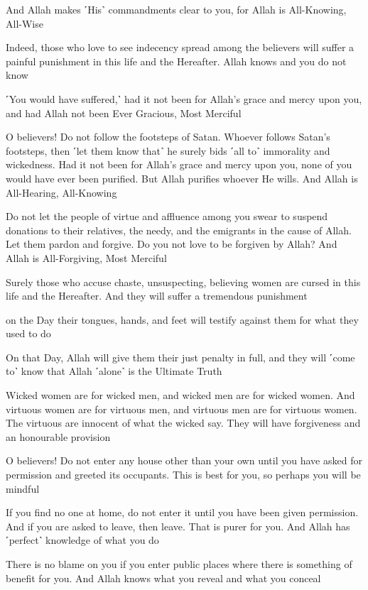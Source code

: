 And Allah makes ˹His˺ commandments clear to you, for Allah is All-Knowing, All-Wise

Indeed, those who love to see indecency spread among the believers will suffer a painful punishment in this life and the Hereafter. Allah knows and you do not know

˹You would have suffered,˺ had it not been for Allah’s grace and mercy upon you, and had Allah not been Ever Gracious, Most Merciful

O believers! Do not follow the footsteps of Satan. Whoever follows Satan’s footsteps, then ˹let them know that˺ he surely bids ˹all to˺ immorality and wickedness. Had it not been for Allah’s grace and mercy upon you, none of you would have ever been purified. But Allah purifies whoever He wills. And Allah is All-Hearing, All-Knowing

Do not let the people of virtue and affluence among you swear to suspend donations to their relatives, the needy, and the emigrants in the cause of Allah. Let them pardon and forgive. Do you not love to be forgiven by Allah? And Allah is All-Forgiving, Most Merciful

Surely those who accuse chaste, unsuspecting, believing women are cursed in this life and the Hereafter. And they will suffer a tremendous punishment

on the Day their tongues, hands, and feet will testify against them for what they used to do

On that Day, Allah will give them their just penalty in full, and they will ˹come to˺ know that Allah ˹alone˺ is the Ultimate Truth

Wicked women are for wicked men, and wicked men are for wicked women. And virtuous women are for virtuous men, and virtuous men are for virtuous women. The virtuous are innocent of what the wicked say. They will have forgiveness and an honourable provision

O believers! Do not enter any house other than your own until you have asked for permission and greeted its occupants. This is best for you, so perhaps you will be mindful

If you find no one at home, do not enter it until you have been given permission. And if you are asked to leave, then leave. That is purer for you. And Allah has ˹perfect˺ knowledge of what you do

There is no blame on you if you enter public places where there is something of benefit for you. And Allah knows what you reveal and what you conceal

